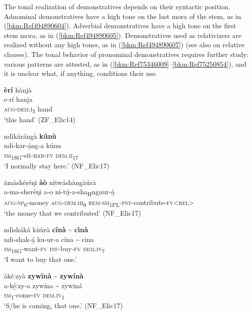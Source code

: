 The tonal realization of demonstratives depends on their syntactic position. Adnominal demonstratives have a high tone on the last mora of the stem, as in (\ref{bkm:Ref494890604}). Adverbial demonstratives have a high tone on the first stem mora, as in (\ref{bkm:Ref494890605}). Demonstratives used as relativizers are realized without any high tones, as in (\ref{bkm:Ref494890607}) (see also  on relative clauses). The tonal behavior of pronominal demonstratives requires further study: various patterns are attested, as in (\ref{bkm:Ref75346009}--\ref{bkm:Ref75250854}), and it is unclear what, if anything, conditions their use.

\ea
\label{bkm:Ref494890604}
\textbf{èrí} hànjà\\
\gll e-rí    hanja\\
\textsc{aug}-\textsc{dem}.\textsc{i}\textsubscript{5}  hand\\
\glt ‘this hand’ (ZF\_Elic14)
\z

\newpage
\ea
\label{bkm:Ref494890605}
ndìkárángà \textbf{kûnù}\\
\gll ndi-kar-á̲ng-a  kúnu\\
\textsc{sm}\textsubscript{1SG}-sit-\textsc{hab}-\textsc{fv}  \textsc{dem}.\textsc{ii}\textsubscript{17}\\
\glt ‘I normally stay here.’ (NF\_Elic17)
\z

\ea
\label{bkm:Ref494890607}
àmàshéréŋì \textbf{àò} nìtwáshàngàúrà\\
\gll a-ma-sheréŋi    a-o    ni-tú̲-a-sha\textsubscript{H}ngaur-á̲\\
\textsc{aug}-\textsc{np}\textsubscript{6}-money  \textsc{aug}-\textsc{dem}.\textsc{iii}\textsubscript{6}  \textsc{rem}-\textsc{sm}\textsubscript{1PL}-\textsc{pst}-contribute-\textsc{fv}<\textsc{rel}>\\
\glt ‘the money that we contributed’ (NF\_Elic17)
\z

\ea
\label{bkm:Ref75346009}
ndìsháká kùùrà \textbf{cînà} {\textasciitilde} \textbf{cìnà}\\
\gll ndi-shak-á̲    ku-ur-a  cína {\textasciitilde} cina\\
\textsc{sm}\textsubscript{1SG}-want-\textsc{fv}  \textsc{inf}-buy-\textsc{fv}  \textsc{dem}.\textsc{iv}\textsubscript{7}\\
\glt ‘I want to buy that one.’
\z

\ea
\label{bkm:Ref75250854}
àkéːzyà \textbf{zywînà} {\textasciitilde} \textbf{zywínà}\\
\gll a-ké̲ːzy-a    zywína {\textasciitilde} zywiná\\
\textsc{sm}\textsubscript{1}-come-\textsc{fv}  \textsc{dem}.\textsc{iv}\textsubscript{1}\\
\glt ‘S/he is coming, that one.’ (NF\_Elic17)
\z

